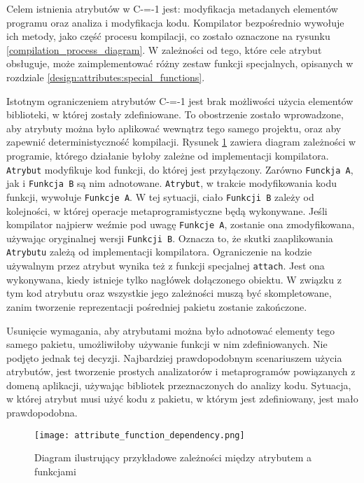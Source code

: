 Celem istnienia atrybutów w C-=-1 jest: modyfikacja metadanych elementów programu oraz analiza i modyfikacja kodu.
Kompilator bezpośrednio wywołuje ich metody, jako część procesu kompilacji, co zostało oznaczone na rysunku \ref{compilation_process_diagram}.
W zależności od tego, które cele atrybut obsługuje, może zaimplementować różny zestaw funkcji specjalnych, opisanych w rozdziale \ref{design:attributes:special_functions}.

Istotnym ograniczeniem atrybutów C-=-1 jest brak możliwości użycia elementów biblioteki, w której zostały zdefiniowane.
To obostrzenie zostało wprowadzone, aby atrybuty można było aplikować wewnątrz tego samego projektu, oraz aby zapewnić deterministyczność kompilacji.
Rysunek \ref{design:attributes:attribute_function_dependendcy} zawiera diagram zależności w programie, którego działanie byłoby zależne od implementacji kompilatora.
\lstinline{Atrybut} modyfikuje kod funkcji, do której jest przyłączony.
Zarówno \lstinline{Funckja A}, jak i \lstinline{Funkcja B} są nim adnotowane.
\lstinline{Atrybut}, w trakcie modyfikowania kodu funkcji, wywołuje \lstinline{Funkcje A}.
W tej sytuacji, ciało \lstinline{Funkcji B} zależy od kolejności, w której operacje metaprogramistyczne będą wykonywane.
Jeśli kompilator najpierw weźmie pod uwagę \lstinline{Funkcje A}, zostanie ona zmodyfikowana, używając oryginalnej wersji \lstinline{Funkcji B}.
Oznacza to, że skutki zaaplikowania \lstinline{Atrybutu} zależą od implementacji kompilatora.
Ograniczenie na kodzie używalnym przez atrybut wynika też z funkcji specjalnej \lstinline{attach}.
Jest ona wykonywana, kiedy istnieje tylko nagłówek dołączonego obiektu.
W związku z tym kod atrybutu oraz wszystkie jego zależności muszą być skompletowane, zanim tworzenie reprezentacji pośredniej pakietu zostanie zakończone.

Usunięcie wymagania, aby atrybutami można było adnotować elementy tego samego pakietu, umożliwiłoby używanie funkcji w nim zdefiniowanych.
Nie podjęto jednak tej decyzji.
Najbardziej prawdopodobnym scenariuszem użycia atrybutów, jest tworzenie prostych analizatorów i metaprogramów powiązanych z domeną aplikacji, używając bibliotek przeznaczonych do analizy kodu.
Sytuacja, w której atrybut musi użyć kodu z pakietu, w którym jest zdefiniowany, jest mało prawdopodobna.

\begin{figure}
	\caption{Diagram ilustrujący przykładowe zależności między atrybutem a funkcjami}
	\label{design:attributes:attribute_function_dependendcy}
	\texttt{[image: attribute\_function\_dependency.png]}
\end{figure}

